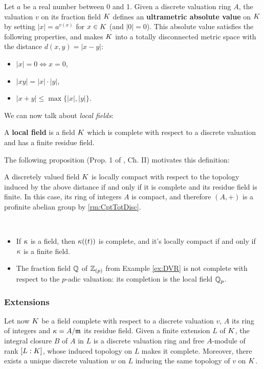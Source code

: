 \documentclass[a4paper, oneside]{memoir}
\begin{document}
Let $a$ be a real number between 0 and 1. Given a discrete valuation ring $A$, the valuation $v$ on its fraction field $K$ defines an \textbf{ultrametric absolute value} on $K$ by setting $|x|=a^{v(x)}$ for $x\in K$ (and
$|0|=0$). This absolute value satisfies the following properties, and makes $K$ into a totally disconnected metric space with the distance $d(x,y)=|x-y|$:
\begin{itemize}
	\item $|x|=0 \iff x=0$,
	\item $|xy|=|x|\cdot|y|$,
	\item $|x+y|\leq\max\{|x|,|y|\}$.
\end{itemize}

We can now talk about \textit{local fields}:

\begin{definition}
	A \textbf{local field} is a field $K$ which is complete with respect to a discrete valuation and has a finite residue field.
\end{definition}

The following proposition (Prop. 1 of \cite{SerreCL}, Ch. II)
motivates this definition:
\begin{proposition}
	A discretely valued field $K$ is locally compact with respect to the topology induced by the above distance if and only if it is complete and its residue field is finite. In
	this case, its ring of integers $A$ is compact, and therefore $(A,+)$ is a profinite abelian group by \ref{rm:CptTotDisc}.
\end{proposition}

\begin{example}\
	\begin{itemize}
		\item If $\kappa$ is a field, then $\kappa((t))$ is complete, and it's locally compact if and only if $\kappa$ is a finite field.
		\item The fraction field $\mathbb{Q}$ of $\mathbb{Z}_{(p)}$ from Example \ref{ex:DVR} is not complete with respect to the $p$-adic valuation: its completion is the local field $\mathbb{Q}_p$.
	\end{itemize}
\end{example}

\subsubsection{Extensions}

Let now $K$ be a field complete with respect to a discrete valuation $v$, $A$ its ring of integers and $\kappa=A/\mathfrak{m}$ its residue field. Given a finite extension $L$ of $K$, the integral closure $B$ of $A$ in $L$ is a discrete valuation ring and free $A$-module of rank $[L:K]$, whose induced
topology on $L$ makes it complete. Moreover, there exists a unique discrete valuation $w$ on $L$ inducing the same topology of $v$ on $K$.
\end{document}
